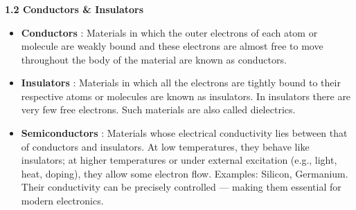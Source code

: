 \begin{frame}[t]
	\frametitle{}
	
	
	\noindent
	\textbf{1.2 Conductors \& Insulators}
	
	\vspace{0.7em}
	
	\begin{itemize}
		\item<+-> \textbf{Conductors} : Materials in which the outer electrons of each atom or molecule are weakly bound and these electrons are almost free to move throughout the body of the material are known as conductors.
		
		\vspace{0.5em}
		
		\item<+-> \textbf{Insulators} : Materials in which all the electrons are tightly bound to their respective atoms or molecules are known as insulators. In insulators there are very few free electrons. Such materials are also called dielectrics.
		
		\vspace{0.5em}
		
		\item<+-> \textbf{Semiconductors} : Materials whose electrical conductivity lies between that of conductors and insulators. At low temperatures, they behave like insulators; at higher temperatures or under external excitation (e.g., light, heat, doping), they allow some electron flow. Examples: Silicon, Germanium. Their conductivity can be precisely controlled — making them essential for modern electronics.
	\end{itemize}

\end{frame}
